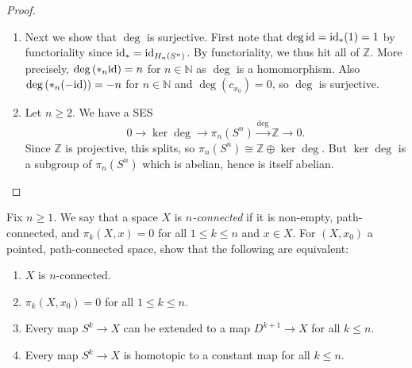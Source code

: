 \begin{proof}
\begin{enumerate}
    \item 
        Next we show that $\deg$ is surjective. 
        First note that
        $\deg {\mathrm{id}} = {\mathrm{id}}_* (1) = 1$ by functoriality since
        ${\mathrm{id}}_* = {\mathrm{id}}_{H_n(S^{n})}$.
        By functoriality, we thus hit
        all of $\mathbb{Z}$. More precisely,
        $\deg \left( \ast_{n} {\mathrm{id}} \right) = n$ for
        $n \in \mathbb{N} $ as
        $\deg$ is a homomorphism.
        Also $\deg \left( \ast_{n} (-{\mathrm{id}}) \right) 
        = -n$ for $n \in \mathbb{N} $ and
        $\deg (c_{x_0}) = 0$, so
        $\deg$ is surjective.
    \item Let $n\ge 2$. We have a SES
        \[
        0 \to \ker \deg \to 
        \pi_n\left( S^{n} \right) \stackrel{\deg}{\to }
        \mathbb{Z} \to 0.
        \] 
        Since $\mathbb{Z}$ is projective, 
        this splits, so
        $\pi_n\left( S^{n} \right) 
        \cong \mathbb{Z} \oplus \ker \deg$.
        But $\ker \deg$ is a subgroup of
        $\pi_n\left( S^{n} \right) $ which is abelian, hence
        is itself abelian.







        \end{enumerate}

    \end{proof}


    \begin{problem}[]
        Fix $n\ge 1$. We say that a space $X$ is
        \textit{$n$-connected} if it is non-empty, path-connected,
        and $\pi_k (X, x) = 0$ for all $1 \le k \le n$ and
        $x \in X$.
        For $\left( X, x_0 \right) $ a pointed, path-connected space,
        show that the following are equivalent:
        \begin{enumerate}
            \item $X$ is $n$-connected.
            \item $\pi_k\left( X,x_0 \right) = 0$ for all
                $1 \le k \le n$.
            \item Every map
                $S^{k} \to X$ can be extended to a map
                $D^{k+1} \to X$ for all $k \le n$.
            \item Every map
                $S^{k} \to X$ is homotopic to a constant
                map for all
                $k \le n$.
        \end{enumerate}
    \end{problem}

